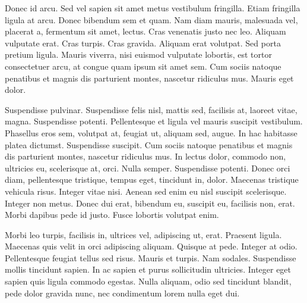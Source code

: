 Donec id arcu. Sed vel sapien sit amet metus vestibulum
fringilla. Etiam fringilla ligula at arcu. Donec bibendum sem et
quam. Nam diam mauris, malesuada vel, placerat a, fermentum sit amet,
lectus. Cras venenatis justo nec leo. Aliquam vulputate erat. Cras
turpis. Cras gravida. Aliquam erat volutpat. Sed porta pretium
ligula. Mauris viverra, nisi euismod vulputate lobortis, est tortor
consectetuer arcu, at congue quam ipsum sit amet sem. Cum sociis
natoque penatibus et magnis dis parturient montes, nascetur ridiculus
mus. Mauris eget dolor.

Suspendisse pulvinar. Suspendisse felis nisl, mattis sed, facilisis
at, laoreet vitae, magna. Suspendisse potenti. Pellentesque et ligula
vel mauris suscipit vestibulum. Phasellus eros sem, volutpat at,
feugiat ut, aliquam sed, augue. In hac habitasse platea
dictumst. Suspendisse suscipit. Cum sociis natoque penatibus et magnis
dis parturient montes, nascetur ridiculus mus. In lectus dolor,
commodo non, ultricies eu, scelerisque at, orci. Nulla
semper. Suspendisse potenti. Donec orci diam, pellentesque tristique,
tempus eget, tincidunt in, dolor. Maecenas tristique vehicula
risus. Integer vitae nisi. Aenean sed enim eu nisl suscipit
scelerisque. Integer non metus. Donec dui erat, bibendum eu, suscipit
eu, facilisis non, erat. Morbi dapibus pede id justo. Fusce lobortis
volutpat enim.

Morbi leo turpis, facilisis in, ultrices vel, adipiscing ut,
erat. Praesent ligula. Maecenas quis velit in orci adipiscing
aliquam. Quisque at pede. Integer at odio. Pellentesque feugiat tellus
sed risus. Mauris et turpis. Nam sodales. Suspendisse mollis tincidunt
sapien. In ac sapien et purus sollicitudin ultricies. Integer eget
sapien quis ligula commodo egestas. Nulla aliquam, odio sed tincidunt
blandit, pede dolor gravida nunc, nec condimentum lorem nulla eget
dui.  
